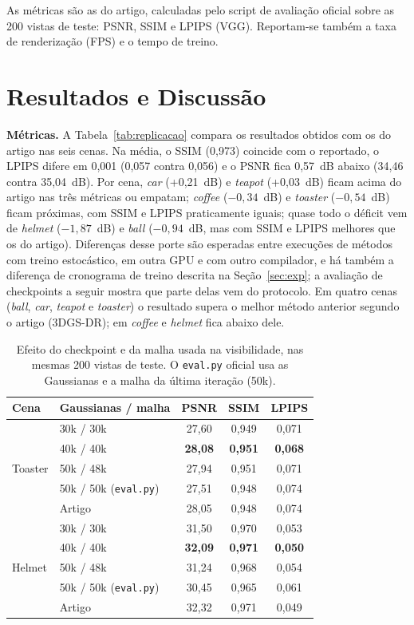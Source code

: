 \documentclass[conference]{IEEEtran}
\begin{document}
As métricas são as do artigo, calculadas pelo script de avaliação oficial sobre as 200 vistas de teste: PSNR, SSIM e LPIPS (VGG). Reportam-se também a taxa de renderização (FPS) e o tempo de treino.

\section{Resultados e Discussão}\label{sec:resultados}

\textbf{Métricas.} A Tabela~\ref{tab:replicacao} compara os resultados obtidos com os do artigo nas seis cenas. Na média, o SSIM (0,973) coincide com o reportado, o LPIPS difere em 0,001 (0,057 contra 0,056) e o PSNR fica 0,57~dB abaixo (34,46 contra 35,04~dB). Por cena, \textit{car} (+0,21~dB) e \textit{teapot} (+0,03~dB) ficam acima do artigo nas três métricas ou empatam; \textit{coffee} ($-0{,}34$~dB) e \textit{toaster} ($-0{,}54$~dB) ficam próximas, com SSIM e LPIPS praticamente iguais; quase todo o déficit vem de \textit{helmet} ($-1{,}87$~dB) e \textit{ball} ($-0{,}94$~dB, mas com SSIM e LPIPS melhores que os do artigo). Diferenças desse porte são esperadas entre execuções de métodos com treino estocástico, em outra GPU e com outro compilador, e há também a diferença de cronograma de treino descrita na Seção~\ref{sec:exp}; a avaliação de checkpoints a seguir mostra que parte delas vem do protocolo. Em quatro cenas (\textit{ball}, \textit{car}, \textit{teapot} e \textit{toaster}) o resultado supera o melhor método anterior segundo o artigo (3DGS-DR); em \textit{coffee} e \textit{helmet} fica abaixo dele.

\begin{table}[t]
\centering
\caption{Efeito do checkpoint e da malha usada na visibilidade, nas mesmas 200 vistas de teste. O \texttt{eval.py} oficial usa as Gaussianas e a malha da última iteração (50k).}
\label{tab:checkpoints}
\setlength{\tabcolsep}{4pt}
\begin{tabular}{llccc}
\toprule
Cena & Gaussianas / malha & PSNR & SSIM & LPIPS \\
\midrule
\multirow{5}{*}{Toaster} & 30k / 30k & 27,60 & 0,949 & 0,071 \\
 & 40k / 40k & \textbf{28,08} & \textbf{0,951} & \textbf{0,068} \\
 & 50k / 48k & 27,94 & 0,951 & 0,071 \\
 & 50k / 50k (\texttt{eval.py}) & 27,51 & 0,948 & 0,074 \\
 & Artigo & 28,05 & 0,948 & 0,074 \\
\midrule
\multirow{5}{*}{Helmet} & 30k / 30k & 31,50 & 0,970 & 0,053 \\
 & 40k / 40k & \textbf{32,09} & \textbf{0,971} & \textbf{0,050} \\
 & 50k / 48k & 31,24 & 0,968 & 0,054 \\
 & 50k / 50k (\texttt{eval.py}) & 30,45 & 0,965 & 0,061 \\
 & Artigo & 32,32 & 0,971 & 0,049 \\
\bottomrule
\end{tabular}
\end{table}
\end{document}
